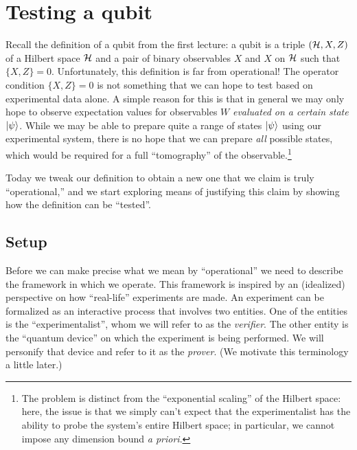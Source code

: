 \chapter{Testing a qubit}

Recall the definition of a qubit from the first lecture: a qubit is a triple $(\mathcal{H},X,Z)$ of a Hilbert space $\mathcal{H}$ and a pair of binary observables $X$ and $X$ on $\mathcal{H}$ such that $\{X,Z\}=0$. Unfortunately, this definition is far from operational! The operator condition $\{X,Z\}=0$ is not something that we can hope to test based on experimental data alone. A simple reason for this is that in general we may only hope to observe expectation values for observables $W$ \emph{evaluated on a certain state} $|\psi\rangle$. While we may be able to prepare quite a range of states $|\psi\rangle$ using our experimental system, there is no hope that we can prepare \emph{all} possible states, which would be required for a full ``tomography'' of the observable.\footnote{The problem is distinct from the ``exponential scaling'' of the Hilbert space: here, the issue is that we simply can't expect that the experimentalist has the ability to probe the system's entire Hilbert space; in particular, we cannot impose any dimension bound \emph{a priori}.} 

Today we tweak our definition to obtain a new one that we claim is truly ``operational,'' and we start exploring means of justifying this claim by showing how the definition can be ``tested''. 

\section{Setup}

Before we can make precise what we mean by ``operational'' we need to describe the framework in which we operate. This framework is inspired by an (idealized) perspective on how ``real-life'' experiments are made. An experiment can be formalized as an interactive process that involves two entities. One of the entities is the ``experimentalist'', whom we will refer to as the \emph{verifier}. The other entity is the ``quantum device'' on which the experiment is being performed. We will personify that device and refer to it as the \emph{prover}. (We motivate this terminology a little later.) 

